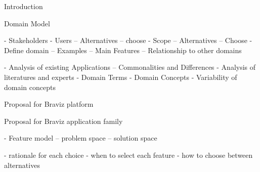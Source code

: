 Introduction



Domain Model

- Stakeholders
- Users
-- Alternatives
-- choose
- Scope
-- Alternatives
-- Choose
- Define domain
-- Examples
-- Main Features
-- Relationship to other domains

- Analysis of existing Applications
-- Commonalities and Differences
- Analysis of literatures and experts
- Domain Terms
- Domain Concepts
- Variability of domain concepts




Proposal for Braviz platform

Proposal for Braviz application family

- Feature model
-- problem space
-- solution space

- rationale for each choice
- when to select each feature
- how to choose between alternatives

